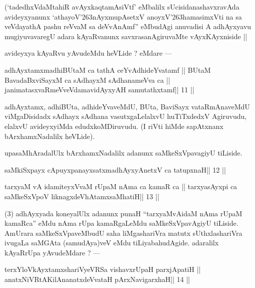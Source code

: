 \begin{artha}
(`tadedhxVdaMtahiR avAyxkaqtamAsiVtf' eMbalilx sUcisidanashavxravAda avideyxyanunx `athayoV\char'263nAyxmupAsetxV anoyxV\char'263hamasimxVti na sa veVdayathA pashu reVvaM sa deVvAnAmf'' eMbudAgi anuvadisi A adhAyx\-yavu mugiyuvavaregU adara kAyaRvanunx savxrasanAgiruvaMte vAyxKAyxniside ||
\end{artha} 
 
 
\begin{artha}
avideyxya kAyaRvu yAvudeMdu heVLide ? eMdare --- 
\end{artha}

\begin{shl}
adhAyxtamxmadhiBUtaM ca tathA ceYvAdhideYvatamf ||
BUtaM BavadaBxviSayxM ca sAdhayxM sAdhanameVva ca ||
janimatasxvaRmeVveVdamavidAyxyAH samutathxtamf\hfill || 11 ||
\end{shl}

\begin{artha}
adhAyxtamx, adhiBUta, adhideYvaveMdU, BUta, BaviSayx vataRmAnaveMdU viMgaDisidadx sAdhayx sAdhana vasutxgaLelalxvU huTiTxdedxV Agiruvudu, elalxvU avideyxyiMda edudxkoMDiruvudu. (I riVti hiMde sapAtxnanx bArxhamxNadalilx heVLide).
\end{artha} 
 
\begin{artha}
upasaMhAradalUlx bArxhamxNadalilx adanunx saMkeSxVpavagiyU tiLiside.
\end{artha}

\begin{shl}
saMkiSxpayx cApuyxpanayxsatxmadhAyxyAnetxV ca tatupxnaH\hfill || 12 ||
\end{shl}

\begin{shl}
tarxyaM vA idamiteyxVvaM rUpaM nAma ca kamaR ca ||
tarxyasAyxpi ca saMkeSxVpoV liknagxdeVhAtamxsaMhatiH\hfill || 13 ||
\end{shl}

\begin{artha}
(3) adhAyxyada koneyalUlx adanunx punaH ``tarxyaMvAidaM nAma rUpaM kamaRca'' eMdu nAma rUpa kamaRgaLeMdu saMkeSxVpavAgiyU tiLiside. AmUrara saMkeSxVpaveMbudU saha liMgashariVra matutx sUthxlashariVra ivugaLa saMGAta (samudAya)veV eMdu tiLiyabahudAgide. adaralilx kAyaRrUpa yAvudeMdare ? ---
\end{artha}

\begin{shl}
terxYloVkAyxtamxshariVyeVRSa vishavxrUpaH parxjApatiH ||
anatxNiVRtAKilAnanatxdeVvataH pArxNavigarxhaH\hfill || 14 ||
\end{shl}

